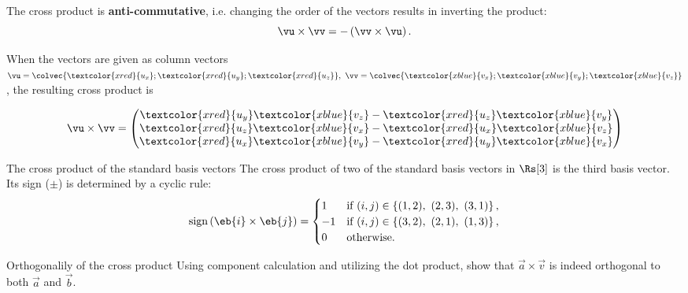 The cross product is \textbf{anti-commutative}, i.e. changing the order of the vectors results in inverting the product:
  \begin{equation*}
  \vu\times\vv = -\left( \vv\times\vu \right).
  \end{equation*}

When the vectors are given as column vectors $\vu=\colvec{\textcolor{xred}{u_{x}};\textcolor{xred}{u_{y}};\textcolor{xred}{u_{z}}},\ \vv=\colvec{\textcolor{xblue}{v_{x}};\textcolor{xblue}{v_{y}};\textcolor{xblue}{v_{z}}}$, the resulting cross product is

\begin{equation}
	\vu\times\vv = \begin{pmatrix}\textcolor{xred}{u_{y}}\textcolor{xblue}{v_{z}}-\textcolor{xred}{u_{z}}\textcolor{xblue}{v_{y}}\\\textcolor{xred}{u_{z}}\textcolor{xblue}{v_{x}}-\textcolor{xred}{u_{x}}\textcolor{xblue}{v_{z}}\\\textcolor{xred}{u_{x}}\textcolor{xblue}{v_{y}}-\textcolor{xred}{u_{y}}\textcolor{xblue}{v_{x}}\end{pmatrix}
	\label{eq:cross product calculation}
\end{equation}

\begin{note}{The cross product of the standard basis vectors}{}
	The cross product of two of the standard basis vectors in $\Rs[3]$ is the third basis vector. Its sign ($\pm$) is determined by a cyclic rule:
	\begin{equation*}
		\text{sign}\left( \eb{i}\times\eb{j} \right) =
		\begin{cases}
			1 & \text{if } (i,j)\in \left\{(1,2),\ (2,3),\ (3,1)\right\},\\
			-1 & \text{if } (i,j)\in \left\{(3,2),\ (2,1),\ (1,3)\right\},\\
			0 & \text{otherwise}.
		\end{cases}
	\end{equation*}
\end{note}
\begin{challenge}{Orthogonalily of the cross product}{}
	Using component calculation and utilizing the dot product, show that $\vec{a}\times\vec{v}$ is indeed orthogonal to both $\vec{a}$ and $\vec{b}$.
\end{challenge}

